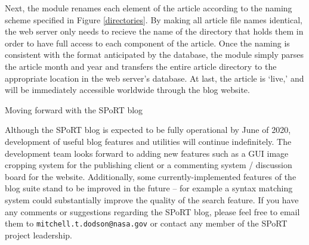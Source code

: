 Next, the module renames each element of the article according to the naming scheme specified in Figure \ref{directories}. By making all article file names identical, the web server only needs to recieve the name of the directory that holds them in order to have full access to each component of the article. Once the naming is consistent with the format anticipated by the database, the module simply parses the article month and year and transfers the entire article directory to the appropriate location in the web server's database. At last, the article is `live,' and will be immediately accessible worldwide through the blog website.

Moving forward with the SPoRT blog

Although the SPoRT blog is expected to be fully operational by June of 2020, development of useful blog features and utilities will continue indefinitely. The development team looks forward to adding new features such as a GUI image cropping system for the publishing client or a commenting system / discussion board for the website. Additionally, some currently-implemented features of the blog suite stand to be improved in the future -- for example a syntax matching system could substantially improve the quality of the search feature. If you have any comments or suggestions regarding the SPoRT blog, please feel free to email them to \texttt{mitchell.t.dodson@nasa.gov} or contact any member of the SPoRT project leadership.
